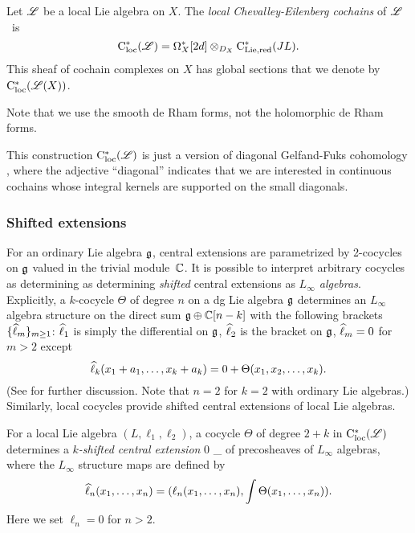 \begin{dfn}
Let $\sL$ be a local Lie algebra on $X$.
The {\em local Chevalley-Eilenberg cochains}  of $\sL$~is 
\[
\cloc^*(\sL) = \Omega^{*}_X[2d] \tensor_{D_X} \cred^*(J L) .
\]
This sheaf of cochain complexes on $X$ has global sections that we denote by~$\cloc^*(\sL(X))$.
\end{dfn}

Note that we use the smooth de Rham forms, not the holomorphic de Rham forms.

\begin{rmk}
This construction $\cloc^*(\sL)$ is just a version of diagonal Gelfand-Fuks cohomology \cite{Fuks, LosikDiag},
where the adjective ``diagonal'' indicates that we are interested in continuous cochains whose integral kernels are supported on the small diagonals.
\end{rmk}

\subsubsection{Shifted extensions}

For an ordinary Lie algebra $\fg$, central extensions are parametrized by 2-cocycles on $\fg$ valued in the trivial module~$\CC$. 
It is possible to interpret arbitrary cocycles as determining as determining {\em shifted} central extensions as {\em $L_\infty$ algebras}.
Explicitly, a $k$-cocycle $\Theta$ of degree $n$ on a dg Lie algebra $\fg$ determines an $L_\infty$ algebra structure on the direct sum $\fg \oplus \CC[n-k]$ with the following brackets $\{\Hat{\ell}_m\}_{m \geq 1}$: $\Hat{\ell}_1$ is simply the differential on $\fg$, $\Hat{\ell}_2$ is the bracket on $\fg$, $\Hat{\ell}_m = 0$ for $m >2$ except
\[
\Hat{\ell}_k(x_1 + a_1, \ldots, x_k + a_k) = 0+ \Theta(x_1,x_2,\ldots, x_k).
\]
(See \cite{KonSoi,LodVal} for further discussion. Note that $n=2$ for $k=2$ with ordinary Lie algebras.)
Similarly, local cocycles provide shifted central extensions of local Lie algebras.

\begin{dfn}
For a local Lie algebra $(L, \ell_1,\ell_2)$, a cocycle $\Theta$ of degree $2+k$ in $\cloc^*(\sL)$ determines a {\em $k$-shifted central extension}
\beqn\label{kext}
0 \to \CC[k] \to \Hat{\sL}_\Theta \to \sL {}
\eeqn
of precosheaves of $L_\infty$ algebras, where the $L_\infty$ structure maps are defined by
\[
\Hat{\ell}_n(x_1,\ldots,x_n) = (\ell_n(x_1,\ldots,x_n), \int \Theta(x_1,\ldots,x_n)).
\]
Here we set $\ell_n = 0$ for $n > 2$.
\end{dfn}

